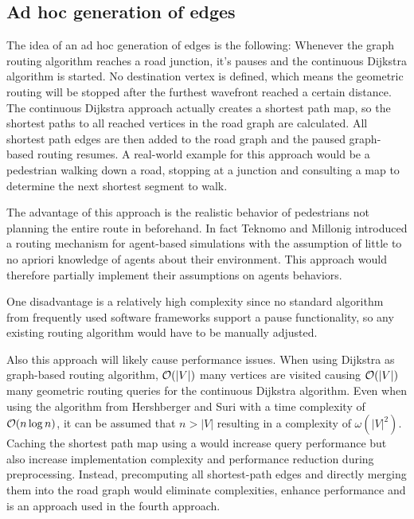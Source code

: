 	\subsection{Ad hoc generation of edges}
	
		The idea of an ad hoc generation of edges is the following:
		Whenever the graph routing algorithm reaches a road junction, it's pauses and the continuous Dijkstra algorithm is started.
		No destination vertex is defined, which means the geometric routing will be stopped after the furthest wavefront reached a certain distance.
		The continuous Dijkstra approach actually creates a shortest path map, so the shortest paths to all reached vertices in the road graph are calculated.
		All shortest path edges are then added to the road graph and the paused graph-based routing resumes.
		A real-world example for this approach would be a pedestrian walking down a road, stopping at a junction and consulting a map to determine the next shortest segment to walk.
		
		The advantage of this approach is the realistic behavior of pedestrians not planning the entire route in beforehand.
		In fact Teknomo and Millonig introduced a routing mechanism for agent-based simulations with the assumption of little to no apriori knowledge of agents about their environment\cite{teknomo-millonig-routing}.
		This approach would therefore partially implement their assumptions on agents behaviors.
		
		One disadvantage is a relatively high complexity since no standard algorithm from frequently used software frameworks support a pause functionality, so any existing routing algorithm would have to be manually adjusted.

		Also this approach will likely cause performance issues.
		When using Dijkstra as graph-based routing algorithm, $\mathcal{O}(|V|)$ many vertices are visited causing $\mathcal{O}(|V|)$ many  geometric routing queries for the continuous Dijkstra algorithm.
		Even when using the algorithm from Hershberger and Suri\cite{hershberger-suri} with a time complexity of $\mathcal{O}(n \log n)$, it can be assumed that $n > |V|$ resulting in a complexity of $\omega(|V|^2)$.
		Caching the shortest path map using a  would increase query performance but also increase implementation complexity and performance reduction during preprocessing.
		Instead, precomputing all shortest-path edges and directly merging them into the road graph would eliminate complexities, enhance performance and is an approach used in the fourth approach.
		
